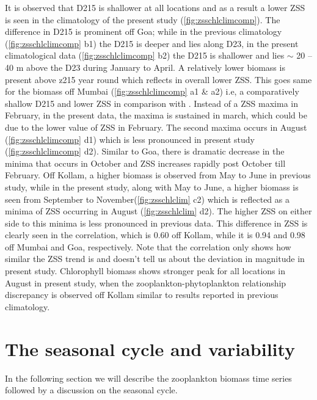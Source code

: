 \documentclass{article}
\begin{document}
	It is observed that D215 is shallower at all locations and as a result a lower ZSS is seen in the climatology of the present study (\cref{fig:zsschlclimcomp}). The difference in D215 is prominent off Goa; while in the previous climatology (\cref{fig:zsschlclimcomp} b1) the D215 is deeper and lies along D23, in the present climatological data (\cref{fig:zsschlclimcomp} b2) the D215 is shallower and lies $\sim$ 20 -- 40 m above the D23 during January to April. A relatively lower biomass is present above z215 year round which reflects in overall lower ZSS. This goes same for the biomass off Mumbai (\cref{fig:zsschlclimcomp} a1 \& a2) i.e, a comparatively shallow D215 and lower ZSS in comparison with \citep{aparna2022seasonal}. Instead of a ZSS maxima in February, in the present data, the maxima is sustained in march, which could be due to the lower value of ZSS in February. The second maxima occurs in August (\cref{fig:zsschlclimcomp} d1) which is less pronounced in present study (\cref{fig:zsschlclimcomp} d2). Similar to Goa, there is dramatic decrease in the minima that occurs in October and ZSS increases rapidly post October till February.  Off Kollam, a higher biomass is observed from May to June in previous study, while in the present study, along with May to June, a higher biomass is seen from September to November(\cref{fig:zsschlclim} c2) which is reflected as a minima of ZSS occurring in August (\cref{fig:zsschlclim} d2). The higher ZSS on either side to this minima is less pronounced in previous data. This difference in ZSS is clearly seen in the correlation, which is 0.60 off Kollam, while it is 0.94 and 0.98 off Mumbai and Goa, respectively. Note that the correlation only shows how similar the ZSS trend is and doesn't tell us about the deviation in magnitude in present study. Chlorophyll biomass shows stronger peak for all locations in August in present study, when the zooplankton-phytoplankton relationship discrepancy is observed off Kollam similar to results reported in previous climatology.
	 
	 
	 
	 
	\section{The seasonal cycle and variability}
	In the following section we will describe the zooplankton biomass time series followed by a discussion on the seasonal cycle.
\end{document}
